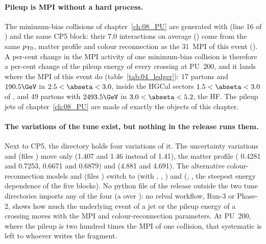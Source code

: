 \paragraph{Pileup is MPI without a hard process.}
The minimum-bias collisions of chapter~\ref{ch:08_PU} are generated with  (line 16
of ) and the same CP5 block: their 7.0 interactions on average
() come from the same $p_{\mathrm{T}0}$, matter profile and colour reconnection as the 31~MPI of
this event (). A per-cent change in the MPI activity of one minimum-bias
collision is therefore a per-cent change of the pileup energy of every crossing at PU~200, and it lands where the
MPI of this event do (table~\ref{tab:04_ledger}): 17 partons and $190.5\GeV$ in $2.5<\abseta<3.0$, inside the
HGCal sectors $1.5<\abseta<3.0$ of , and 49 partons
with $2493.5\GeV$ in $3.0<\abseta<5.2$, the HF. The pileup jets of chapter~\ref{ch:08_PU} are made of exactly the
objects of this chapter.

\paragraph{The variations of the tune exist, but nothing in the release runs them.}
Next to CP5, the directory  holds four variations of it. The uncertainty variations
 and  (files ) move only
 (1.407 and 1.46 instead of 1.41), the matter profile ( 0.4281 and 0.7253,
 0.6671 and 0.6879) and  (4.881 and 4.691). The alternative
colour-reconnection models  and  (files ) switch
to  (with , ,
) and  (, , the steepest energy
dependence of the five blocks). No python file of the release outside the two tune directories imports any of
the four (a  over ): no relval workflow, Run-3 or Phase-2, shows how
much the underlying event of a jet or the pileup energy of a crossing moves with the MPI and colour-reconnection
parameters. At PU~200, where the pileup is two hundred times the MPI of one collision, that systematic is left to
whoever writes the fragment.

